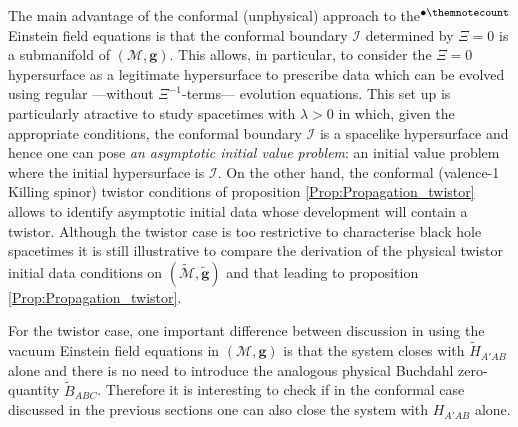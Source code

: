\documentclass[10pt,a4paper]{article}
\theoremstyle{plain}
\def\bmg{{\bm g}}
\newcounter{mnotecount}%
\newcommand{\mnotex}[1]%
{\protect{\stepcounter{mnotecount}}$^{\mbox{\footnotesize $\bullet$\themnotecount}}$ 
\marginpar{%
\raggedright\tiny\em
$\!\!\!\!\!\!\,\bullet$\themnotecount: #1} }
\begin{document}
The main advantage of the conformal (unphysical) approach to the\mnotex{Absorb into intro}
Einstein field equations is that the conformal boundary $\mathscr{I}$
determined by $\Xi=0$ is a submanifold of $(\mathcal{M},\bmg)$. This
allows, in particular, to consider the $\Xi=0$ hypersurface as a
legitimate hypersurface to prescribe data which can be evolved using
regular ---without $\Xi^{-1}$-terms--- evolution equations.  This set up is
particularly atractive to study spacetimes with $\lambda>0$ in which, given the appropriate conditions,
 the conformal boundary $\mathscr{I}$
is a spacelike hypersurface and hence one can pose \emph{an asymptotic
initial value problem}: an initial value problem where the initial
hypersurface is $\mathscr{I}$.
On the other hand, the conformal (valence-1 Killing spinor) twistor conditions
of proposition \eqref{Prop:Propagation_twistor} allows to identify
asymptotic initial data  whose development will
contain a twistor. Although the twistor case is too restrictive to
characterise black hole spacetimes
it is still illustrative to compare the derivation of the physical
twistor initial data conditions on
$(\tilde{\mathcal{M}},\tilde{\bmg})$ and that leading to proposition
\eqref{Prop:Propagation_twistor}.

For the twistor case, one important difference between discussion in
\cite{GasVal15} using the vacuum Einstein field equations in  $(\mathcal{M},\bmg)$
is that the system closes with $\tilde{H}_{A'AB}$ alone and there is no need
to introduce the analogous physical Buchdahl zero-quantity $\tilde{B}_{ABC}$.
Therefore it is interesting to check if in the conformal case discussed
in the previous sections one can also close the system with $H_{A'AB}$ alone.
\end{document}
